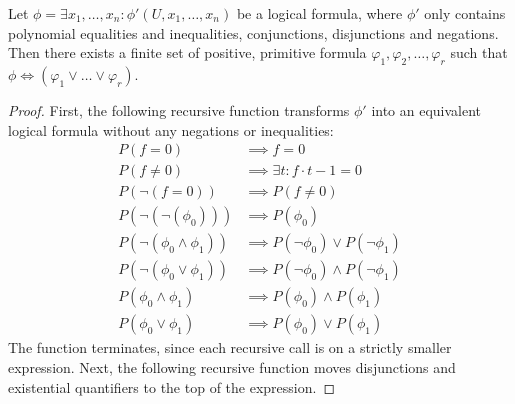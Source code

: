 \begin{lemma}\label{lem:logical_positive}
Let $\phi = \exists x_{1}, \dots, x_{n} : \phi'(U, x_{1}, \dots, x_{n})$ be a logical formula, where $\phi'$ only contains polynomial equalities and inequalities, conjunctions, disjunctions and negations. Then there exists a finite set of positive, primitive formula $\varphi_{1}, \varphi_{2}, \dots, \varphi_{r}$ such that $\phi \iff (\varphi_{1} \lor \dots \lor \varphi_{r})$.
\end{lemma}
\begin{proof}
  First, the following recursive function transforms $\phi'$ into an equivalent logical formula without any negations or inequalities:
  \begin{align*}
    P(f = 0) &\implies f = 0 \\
    P(f \neq 0) &\implies \exists t : f \cdot t - 1 = 0 \\
    P(\neg(f = 0)) &\implies P(f \neq 0) \\
    P(\neg(\neg(\phi_{0}))) &\implies P(\phi_{0}) \\
    P(\neg(\phi_{0} \land \phi_{1})) &\implies P(\neg \phi_{0}) \lor P(\neg \phi_{1}) \\
    P(\neg(\phi_{0} \lor \phi_{1})) &\implies P(\neg \phi_{0}) \land P(\neg \phi_{1}) \\
    P(\phi_{0} \land \phi_{1}) &\implies P(\phi_{0}) \land P(\phi_{1}) \\
    P(\phi_{0} \lor \phi_{1}) &\implies P(\phi_{0}) \lor P(\phi_{1})
  \end{align*}
  The function terminates, since each recursive call is on a strictly smaller expression. Next, the following recursive function moves disjunctions and existential quantifiers to the top of the expression.


\end{proof}
